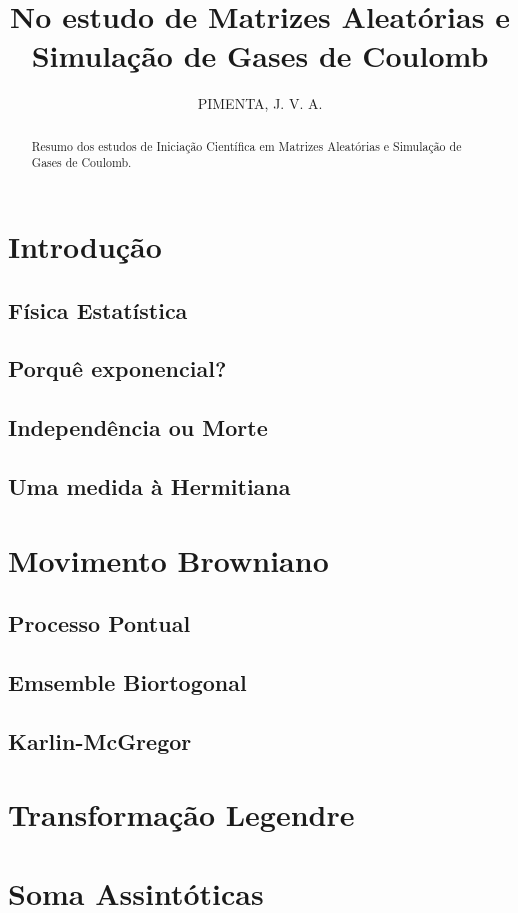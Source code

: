 \documentclass[11pt,oneside,a4paper]{report}
\title{
	{No estudo de Matrizes Aleatórias e Simulação de Gases de Coulomb}\\
}
\author{PIMENTA, J. V. A.}
\begin{document}
\maketitle

\begin{abstract}
	Resumo dos estudos de Iniciação Científica em Matrizes Aleatórias e Simulação de Gases de Coulomb.
\end{abstract}

\tableofcontents

\chapter{Introdução}


\section{Física Estatística}


\section{Porquê exponencial?}


\section{Independência ou Morte}


\section{Uma medida à Hermitiana}


\chapter{Movimento Browniano}


\section{Processo Pontual}


\section{Emsemble Biortogonal}


\section{Karlin-McGregor}


{}


\appendix
\chapter{Transformação Legendre}
\label{apdx: legendre}


\chapter{Soma Assintóticas}
\label{apdx: somaassin}

\end{document}
